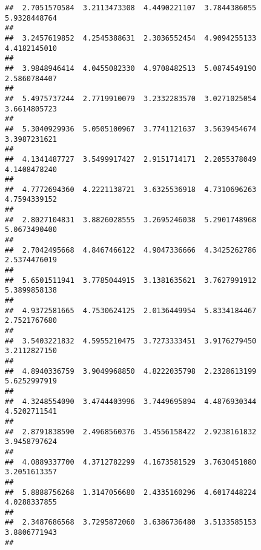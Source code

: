 \documentclass[]{article}
\begin{document}
\begin{verbatim}
##  2.7051570584  3.2113473308  4.4490221107  3.7844386055  5.9328448764 
##                                                                       
##  3.2457619852  4.2545388631  2.3036552454  4.9094255133  4.4182145010 
##                                                                       
##  3.9848946414  4.0455082330  4.9708482513  5.0874549190  2.5860784407 
##                                                                       
##  5.4975737244  2.7719910079  3.2332283570  3.0271025054  3.6614805723 
##                                                                       
##  5.3040929936  5.0505100967  3.7741121637  3.5639454674  3.3987231621 
##                                                                       
##  4.1341487727  3.5499917427  2.9151714171  2.2055378049  4.1408478240 
##                                                                       
##  4.7772694360  4.2221138721  3.6325536918  4.7310696263  4.7594339152 
##                                                                       
##  2.8027104831  3.8826028555  3.2695246038  5.2901748968  5.0673490400 
##                                                                       
##  2.7042495668  4.8467466122  4.9047336666  4.3425262786  2.5374476019 
##                                                                       
##  5.6501511941  3.7785044915  3.1381635621  3.7627991912  5.3899858138 
##                                                                       
##  4.9372581665  4.7530624125  2.0136449954  5.8334184467  2.7521767680 
##                                                                       
##  3.5403221832  4.5955210475  3.7273333451  3.9176279450  3.2112827150 
##                                                                       
##  4.8940336759  3.9049968850  4.8222035798  2.2328613199  5.6252997919 
##                                                                       
##  4.3248554090  3.4744403996  3.7449695894  4.4876930344  4.5202711541 
##                                                                       
##  2.8791838590  2.4968560376  3.4556158422  2.9238161832  3.9458797624 
##                                                                       
##  4.0889337700  4.3712782299  4.1673581529  3.7630451080  3.2051613357 
##                                                                       
##  5.8888756268  1.3147056680  2.4335160296  4.6017448224  4.0288337855 
##                                                                       
##  2.3487686568  3.7295872060  3.6386736480  3.5133585153  3.8806771943 
##                                                                       

\end{verbatim}
\end{document}
